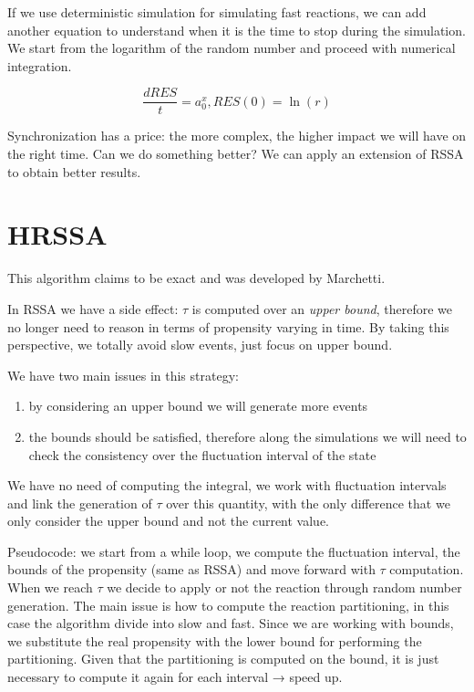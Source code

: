 If we use deterministic simulation for simulating fast reactions, we can
add another equation to understand when it is the time to stop during
the simulation. We start from the logarithm of the random number and
proceed with numerical integration.

$$
\frac{dRES}{t} = a_0^x,RES(0)= \ln(r)
$$

Synchronization has a price: the more complex, the higher impact we will
have on the right time. Can we do something better? We can apply an
extension of RSSA to obtain better results.

\hypertarget{hrssa}{%
\section{HRSSA}\label{hrssa}}

This algorithm claims to be exact and was developed by Marchetti.

In RSSA we have a side effect: $\tau$ is computed over an \emph{upper
bound}, therefore we no longer need to reason in terms of propensity
varying in time. By taking this perspective, we totally avoid slow
events, just focus on upper bound.

We have two main issues in this strategy:

\begin{enumerate}
\def\labelenumi{\arabic{enumi}.}
\tightlist
\item
  by considering an upper bound we will generate more events
\item
  the bounds should be satisfied, therefore along the simulations we
  will need to check the consistency over the fluctuation interval of
  the state
\end{enumerate}

We have no need of computing the integral, we work with fluctuation
intervals and link the generation of $\tau$ over this quantity, with the
only difference that we only consider the upper bound and not the
current value.

Pseudocode: we start from a while loop, we compute the fluctuation
interval, the bounds of the propensity (same as RSSA) and move forward
with $\tau$ computation. When we reach $\tau$ we decide to apply or not
the reaction through random number generation. The main issue is how to
compute the reaction partitioning, in this case the algorithm divide
into slow and fast. Since we are working with bounds, we substitute the
real propensity with the lower bound for performing the partitioning.
Given that the partitioning is computed on the bound, it is just
necessary to compute it again for each interval → speed up.

